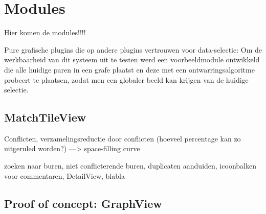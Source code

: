 \chapter{Modules}
\label{modules}

Hier komen de modules!!!!

Pure grafische plugins die op andere plugins vertrouwen voor data-selectie: Om de werkbaarheid van dit systeem uit te testen werd een voorbeeldmodule ontwikkeld die alle huidige paren in een grafe plaatst en deze met een ontwarringsalgoritme probeert te plaatsen, zodat men een globaler beeld kan krijgen van de huidige selectie.

\section{MatchTileView}

Conflicten, verzamelingsreductie door conflicten (hoeveel percentage kan zo uitgeruled worden?) ---> space-filling curve

zoeken naar buren, niet conflicterende buren, duplicaten aanduiden, icoonbalken voor commentaren, DetailView, blabla

\section{Proof of concept: GraphView}